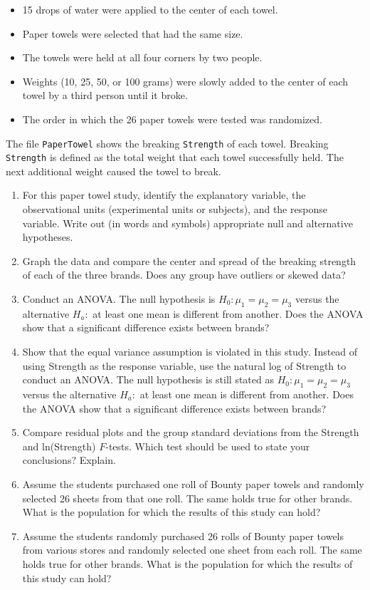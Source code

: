 \documentclass[
]{book}
\begin{document}
\begin{enumerate}
\begin{itemize}
  \item 15 drops of water were applied to the center of each towel.
  \item Paper towels were selected that had the same size.
  \item The towels were held at all four corners by two people.
  \item Weights (10, 25, 50, or 100 grams) were slowly added to the center of each towel by a third person until it broke.
  \item The order in which the 26 paper towels were tested was randomized.
\end{itemize}

The file \texttt{PaperTowel} shows the breaking \texttt{Strength} of each towel. Breaking \texttt{Strength} is defined as the total weight that each towel successfully held. The next additional weight caused the towel to break.

  \begin{enumerate}
    \item For this paper towel study, identify the explanatory variable, the observational units (experimental units or subjects), and the response variable. Write out (in words and symbols) appropriate null and alternative hypotheses.
      \item Graph the data and compare the center and spread of the breaking strength of each of the three brands. Does any group have outliers or skewed data?
      \item Conduct an ANOVA. The null hypothesis is $H_0\colon \mu_1 = \mu_2 = \mu_3$ versus the alternative $H_a\colon$ at least one mean is different from another. Does the ANOVA show that a significant difference exists between brands?
      \item Show that the equal variance assumption is violated in this study. Instead of using Strength as the response variable, use the natural log of Strength to conduct an ANOVA. The null hypothesis is still stated as $H_0\colon \mu_1 = \mu_2 = \mu_3$ versus the alternative $H_a\colon$ at least one mean is different from another. Does the ANOVA show that a significant difference exists between brands?
      \item Compare residual plots and the group standard deviations from the Strength and ln(Strength) $F$-tests. Which test should be used to state your conclusions? Explain.
      \item Assume the students purchased one roll of Bounty paper towels and randomly selected 26 sheets from that one roll. The same holds true for other brands. What is the population for which the results of this study can hold?
      \item Assume the students randomly purchased 26 rolls of Bounty paper towels from various stores and randomly selected one sheet from each roll. The same holds true for other brands. What is the population for which the results of this study can hold?
    \end{enumerate}


\end{enumerate}
\end{document}

